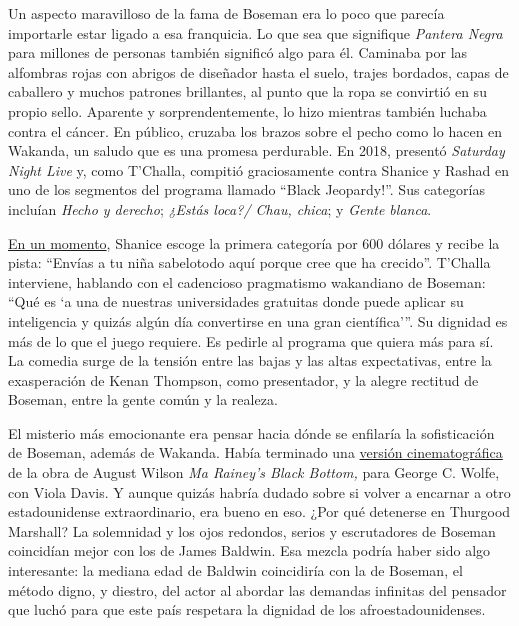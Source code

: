 Un aspecto maravilloso de la fama de Boseman era lo poco que parecía
importarle estar ligado a esa franquicia. Lo que sea que signifique
\emph{Pantera Negra} para millones de personas también significó algo
para él. Caminaba por las alfombras rojas con abrigos de diseñador hasta
el suelo, trajes bordados, capas de caballero y muchos patrones
brillantes, al punto que la ropa se convirtió en su propio sello.
Aparente y sorprendentemente, lo hizo mientras también luchaba contra el
cáncer. En público, cruzaba los brazos sobre el pecho como lo hacen en
Wakanda, un saludo que es una promesa perdurable. En 2018, presentó
\emph{Saturday Night Live} y, como T'Challa, compitió graciosamente
contra Shanice y Rashad en uno de los segmentos del programa llamado
``Black Jeopardy!''. Sus categorías incluían \emph{Hecho y derecho};
\emph{¿Estás loca?/ Chau, chica}; y \emph{Gente blanca}.

\href{https://www.youtube.com/watch?v=hzMzFGgmQOc}{En un momento},
Shanice escoge la primera categoría por 600 dólares y recibe la pista:
``Envías a tu niña sabelotodo aquí porque cree que ha crecido''.
T'Challa interviene, hablando con el cadencioso pragmatismo wakandiano
de Boseman: ``Qué es `a una de nuestras universidades gratuitas donde
puede aplicar su inteligencia y quizás algún día convertirse en una gran
científica'''. Su dignidad es más de lo que el juego requiere. Es
pedirle al programa que quiera más para sí. La comedia surge de la
tensión entre las bajas y las altas expectativas, entre la exasperación
de Kenan Thompson, como presentador, y la alegre rectitud de Boseman,
entre la gente común y la realeza.

El misterio más emocionante era pensar hacia dónde se enfilaría la
sofisticación de Boseman, además de Wakanda. Había terminado una
\href{https://deadline.com/2020/08/netflix-delays-ma-raineys-black-bottom-virtual-preview-event-following-chadwick-boseman-death-1203026802/}{versión
cinematográfica} de la obra de August Wilson \emph{Ma Rainey's Black
Bottom,} para George C. Wolfe, con Viola Davis. Y aunque quizás habría
dudado sobre si volver a encarnar a otro estadounidense extraordinario,
era bueno en eso. ¿Por qué detenerse en Thurgood Marshall? La solemnidad
y los ojos redondos, serios y escrutadores de Boseman coincidían mejor
con los de James Baldwin. Esa mezcla podría haber sido algo interesante:
la mediana edad de Baldwin coincidiría con la de Boseman, el método
digno, y diestro, del actor al abordar las demandas infinitas del
pensador que luchó para que este país respetara la dignidad de los
afroestadounidenses.

